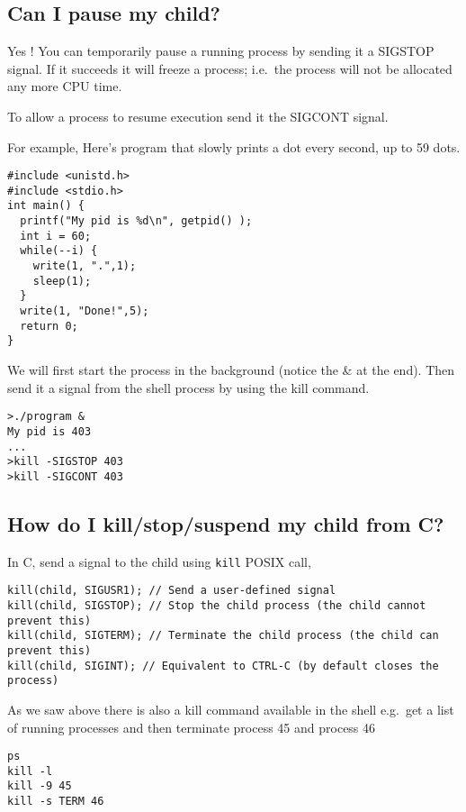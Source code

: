 \subsection{Can I pause my child?}\label{can-i-pause-my-child}

Yes ! You can temporarily pause a running process by sending it a
SIGSTOP signal. If it succeeds it will freeze a process; i.e.~the
process will not be allocated any more CPU time.

To allow a process to resume execution send it the SIGCONT signal.

For example, Here's program that slowly prints a dot every second, up to
59 dots.

\begin{verbatim}
#include <unistd.h>
#include <stdio.h>
int main() {
  printf("My pid is %d\n", getpid() );
  int i = 60;
  while(--i) { 
    write(1, ".",1);
    sleep(1);
  }
  write(1, "Done!",5);
  return 0;
}
\end{verbatim}

We will first start the process in the background (notice the \& at the
end). Then send it a signal from the shell process by using the kill
command.

\begin{verbatim}
>./program &
My pid is 403
...
>kill -SIGSTOP 403
>kill -SIGCONT 403
\end{verbatim}

\subsection{How do I kill/stop/suspend my child from
C?}\label{how-do-i-killstopsuspend-my-child-from-c}

In C, send a signal to the child using \texttt{kill} POSIX call,

\begin{verbatim}
kill(child, SIGUSR1); // Send a user-defined signal
kill(child, SIGSTOP); // Stop the child process (the child cannot prevent this)
kill(child, SIGTERM); // Terminate the child process (the child can prevent this)
kill(child, SIGINT); // Equivalent to CTRL-C (by default closes the process)
\end{verbatim}

As we saw above there is also a kill command available in the shell
e.g.~get a list of running processes and then terminate process 45 and
process 46

\begin{verbatim}
ps
kill -l 
kill -9 45
kill -s TERM 46
\end{verbatim}

